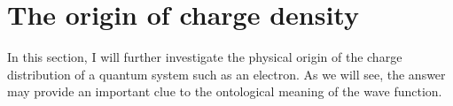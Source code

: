 \section{The origin of charge density}

In this section, I will further investigate the physical origin of the charge distribution of a quantum system such as an electron. As we will see, the answer may provide an important clue to the ontological meaning of the wave function.

